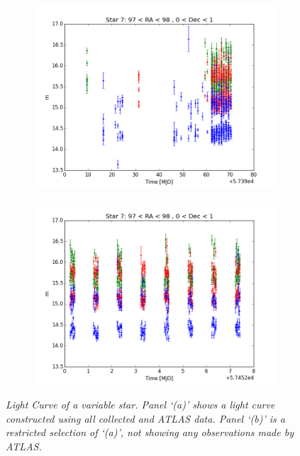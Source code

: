 \documentclass[aps,prb,twocolumn,superscriptaddress]{revtex4-1}
\begin{document}
\begin{figure}
	\centering
	\begin{subfigure}{.5\textwidth}
	  \centering
	  \includegraphics[width=1\linewidth]{figures/LC/star7_97_98_0_1.png}
		\caption{\it \small{ }}
		\label{fig:LC7}
	\end{subfigure}%
	\begin{subfigure}{.5\textwidth}
	  \centering
			\includegraphics[width=1\linewidth]{figures/LC/star7_97_98_0_1_restricted.png}
		\caption{\it \small{ }}
		\label{fig:restrictedLC7}
	\end{subfigure}
	\caption{\it \small{Light Curve of a variable star.  Panel `(a)' shows a light curve constructed using all collected and ATLAS data.  Panel `(b)' is a restricted selection of `(a)', not showing any observations made by ATLAS.}}
	\label{fig:LC}
\end{figure}
\end{document}
